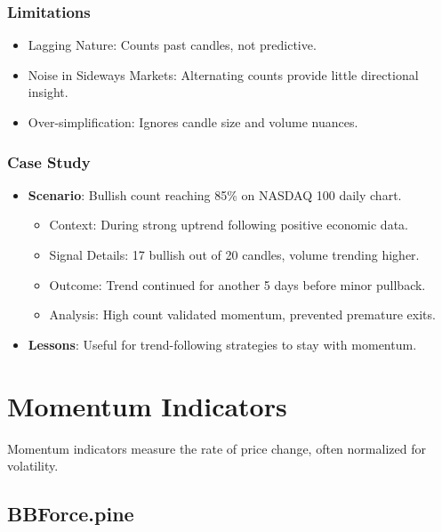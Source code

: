 \documentclass[12pt]{article}
\begin{document}
\subsubsection{Limitations}
\begin{itemize}
\item Lagging Nature: Counts past candles, not predictive.
\item Noise in Sideways Markets: Alternating counts provide little directional insight.
\item Over-simplification: Ignores candle size and volume nuances.
\end{itemize}

\subsubsection{Case Study}
\begin{itemize}
\item \textbf{Scenario}: Bullish count reaching 85\% on NASDAQ 100 daily chart.
  \begin{itemize}
  \item Context: During strong uptrend following positive economic data.
  \item Signal Details: 17 bullish out of 20 candles, volume trending higher.
  \item Outcome: Trend continued for another 5 days before minor pullback.
  \item Analysis: High count validated momentum, prevented premature exits.
  \end{itemize}
\item \textbf{Lessons}: Useful for trend-following strategies to stay with momentum.
\end{itemize}

\section{Momentum Indicators}
\label{sec:momentum}

Momentum indicators measure the rate of price change, often normalized for volatility.

\subsection{BBForce.pine}
\label{subsec:bbforce}
\end{document}

